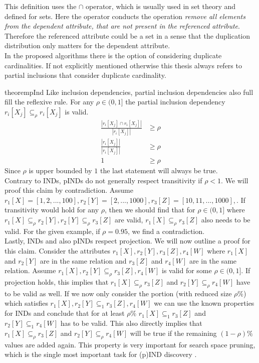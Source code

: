 \noindent This definition uses the $\cap$ operator, which is usually used in set theory and defined for sets. Here the operator conducts the operation \textit{remove all elements from the dependent attribute, that are not present in the referenced attribute}. Therefore the referenced attribute could be a set in a sense that the duplication distribution only matters for the dependent attribute.\\

In the proposed algorithms there is the option of considering duplicate cardinalities. If not explicitly mentioned otherwise this thesis always refers to partial inclusions that consider duplicate cardinality.

\begin{restatable}{theorem}{pInd}\label{theo:pInd}
    Like inclusion dependencies, partial inclusion dependencies also full fill the reflexive rule. For any $\rho \in (0, 1]$ the partial inclusion dependency $r_i[X_j] \subseteq_{\rho} r_i[X_j]$ is valid.
    \begin{align*}
        \frac{|r_i[X_j] \cap r_i[X_j]|}
            {|r_i[X_j]|} & \geq \rho \\
        \frac{|r_i[X_j]|}
            {|r_i[X_j]|} & \geq \rho \\
            1 & \geq \rho
     \end{align*}
     Since $\rho$ is upper bounded by $1$ the last statement will always be true. \\

     \noindent Contrary to INDs, pINDs do not generally respect transitivity if $\rho < 1$. We will proof this claim by contradiction. Assume $r_1[X] = [1, 2, ..., 100], r_2[Y] = [2, ..., 1000], r_3[Z] = [10, 11, ..., 1000],$. If transitivity would hold for any $\rho$, then we should find that for $\rho \in (0, 1]$ where $r_1[X] \subseteq_\rho r_2[Y], r_2[Y] \subseteq_\rho  r_3[Z]$ are valid, $ r_1[X] \subseteq_\rho  r_3[Z]$ also needs to be valid. For the given example, if $\rho = 0.95$, we find a contradiction. \\

     \noindent Lastly, INDs and also pINDs respect projection. We will now outline a proof for this claim. Consider the attributes $r_1[X], r_2[Y], r_3[Z], r_4[W]$ where $r_1[X]$ and $r_2[Y]$ are in the same relation and $r_3[Z]$ and $r_4[W]$ are in the same relation. Assume $r_1[X], r_2[Y] \subseteq_\rho r_3[Z], r_4[W]$ is valid for some $\rho \in (0, 1]$. If projection holds, this implies that $r_1[X] \subseteq_\rho r_3[Z]$ and $r_2[Y] \subseteq_\rho r_4[W]$ have to be valid as well. If we now only consider the portion (with reduced size $\rho\%$) which satisfies $r_1[X], r_2[Y] \subseteq_1 r_3[Z], r_4[W]$ we can use the known properties for INDs and conclude that for at least $\rho\%$ $r_1[X] \subseteq_1 r_3[Z]$ and $r_2[Y] \subseteq_1 r_4[W]$ has to be valid. This also directly implies that $r_1[X] \subseteq_\rho r_3[Z]$ and $r_2[Y] \subseteq_\rho r_4[W]$ will be true if the remaining $(1-\rho)\%$ values are added again. This property is very important for search space pruning, which is the single most important task for (p)IND discovery \cite{liu2010discover}.
\end{restatable}

